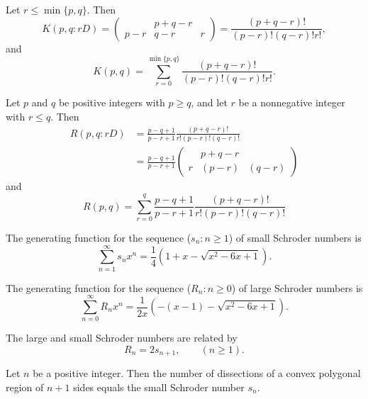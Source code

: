\begin{theorem}
  \label{thm:8.5.4}
  Let $r \leq \min\{p, q\}$. Then 
  \[ K(p, q : rD) = \begin{pmatrix} & p+q-r & \\ p-r & q-r & r \end{pmatrix} = \frac{(p+q-r)!}{(p-r)!(q-r)!r!}, \]
  and 
  \[ K(p,q) = \sum\limits_{r=0}^{\min\{p, q\}}\frac{(p+q-r)!}{(p-r)!(q-r)!r!}. \]
\end{theorem}

\begin{theorem}
  \label{thm:8.5.5}
  Let $p$ and $q$ be positive integers with $p \geq q$, and let $r$ be a nonnegative integer with 
  $r \leq q$. Then
  \begin{align*}
    R(p, q : rD) &= \frac{p-q+1}{p-r+1}\frac{(p+q-r)!}{r!(p-r)!(q-r)!} \\
    &= \frac{p-q+1}{p-r+1}
      \begin{pmatrix}
         & p+q-r & \\
        r & (p-r) & (q-r)
      \end{pmatrix}
  \end{align*}
  and
  \[R(p, q)=\sum\limits_{r=0}^q \frac{p-q+1}{p-r+1} \frac{(p+q-r)!}{r!(p-r)!(q-r)!}\]
\end{theorem}

\begin{theorem}
  \label{thm:8.5.6}
  The generating function for the sequence ($s_n: n \geq 1$) of small Schroder numbers is
  \[\sum\limits_{n=1}^{\infty} s_n x^n=\frac{1}{4}\left(1+x-\sqrt{x^2-6 x+1}\right). \]
\end{theorem}

\begin{theorem}
  \label{thm:8.5.7}
  The generating function for the sequence ($R_n: n \geq 0$) of large Schroder numbers is
  \[\sum\limits_{n=0}^{\infty} R_n x^n=\frac{1}{2x}\left(-(x - 1)-\sqrt{x^2-6 x+1}\right). \]
\end{theorem}

\begin{corollary}
  \label{cor:8.5.8}
  The large and small Schroder numbers are related by
  \[ R_n = 2s_{n+1}, \qquad (n \geq 1). \]
\end{corollary}

\begin{theorem}
  \label{thm:8.5.9}
  Let $n$ be a positive integer. Then the number of dissections of a convex polygonal region of 
  $n + 1$ sides equals the small Schroder number $s_n$.
\end{theorem}

